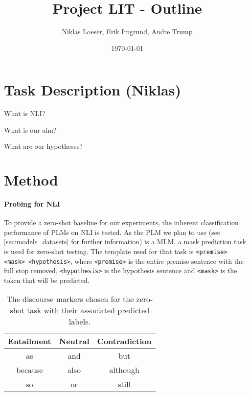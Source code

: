 \documentclass[12pt,a4paper]{article}
\title{Project LIT - Outline}
\author{Niklas Loeser, Erik Imgrund, Andre Trump}
\date{\today}
\begin{document}
\begin{acronym}
\end{acronym}

\maketitle

\section{Task Description (Niklas)}
What is NLI?

What is our aim?

What are our hypotheses?

\section{Method}
\paragraph{Probing for \acs{NLI}}
To provide a zero-shot baseline for our experiments, the inherent classification performance of \acp{PLM} on \acs{NLI} is tested. As the \ac{PLM} we plan to use (see \autoref{sec:models_datasets} for further information) is a \ac{MLM}, a mask prediction task is used for zero-shot testing. The template used for that task is \texttt{<premise> <mask> <hypothesis>}, where \texttt{<premise>} is the entire premise sentence with the full stop removed, \texttt{<hypothesis>} is the hypothesis sentence and \texttt{<mask>} is the token that will be predicted. 

\begin{table}[h]
    \centering
    \caption{The discourse markers chosen for the zero-shot task with their associated predicted labels.}
    \begin{tabular}{c | c | c}
        Entailment & Neutral & Contradiction \\
        \hline
        as & and  & but \\
        because & also & although \\
        so & or & still
    \end{tabular}
    \label{tab:discourse:markers}
\end{table}
\end{document}
